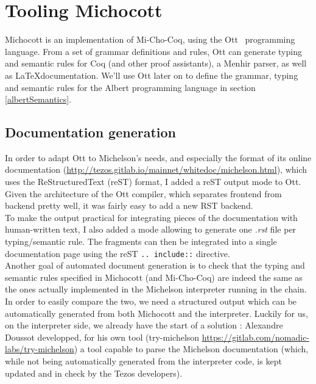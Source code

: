 \documentclass{report}
\begin{document}
\section{Tooling Michocott}

Michocott is an implementation of Mi-Cho-Coq, using the Ott~\cite{ottLang} programming language. From a set of grammar definitions and rules, Ott can generate typing and semantic rules for Coq (and other proof assistants), a Menhir parser, as well as \LaTeX documentation. We'll use Ott later on to define the grammar, typing and semantic rules for the Albert programming language in section \ref{albertSemantics}.

\subsection{Documentation generation}

In order to adapt Ott to Michelson's needs, and especially the format of its online documentation (\url{http://tezos.gitlab.io/mainnet/whitedoc/michelson.html}), which uses the ReStructuredText (reST) format, I added a reST output mode to Ott. Given the architecture of the Ott compiler, which separates frontend from backend pretty well, it was fairly easy to add a new RST backend.\\
To make the output practical for integrating pieces of the documentation with human-written text, I also added a mode allowing to generate one \textit{.rst} file per typing/semantic rule. The fragments can then be integrated into a single documentation page using the reST \texttt{.. include::} directive.\\

Another goal of automated document generation is to check that the typing and semantic rules specified in Michocott (and Mi-Cho-Coq) are indeed the same as the ones actually implemented in the Michelson interpreter running in the chain. In order to easily compare the two, we need a structured output which can be automatically generated from both Michocott and the interpreter. Luckily for us, on the interpreter side, we already have the start of a solution : Alexandre Doussot developped, for his own tool (try-michelson \url{https://gitlab.com/nomadic-labs/try-michelson}) a tool capable to parse the Michelson documentation (which, while not being automatically generated from the interpreter code, is kept updated and in check by the Tezos developers).
\end{document}
